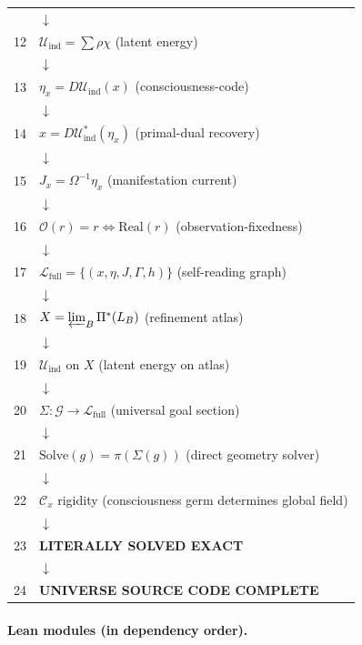\begin{center}
\begin{tabular}{@{}rl@{}}
  & $\downarrow$ \\
12 & $\mathcal{U}_{\mathrm{ind}} = \sum \rho\chi$ (latent energy) \\
  & $\downarrow$ \\
13 & $\eta_x = D\mathcal{U}_{\mathrm{ind}}(x)$ (consciousness-code) \\
  & $\downarrow$ \\
14 & $x = D\mathcal{U}_{\mathrm{ind}}^*(\eta_x)$ (primal-dual recovery) \\
  & $\downarrow$ \\
15 & $J_x = \Omega^{-1}\eta_x$ (manifestation current) \\
  & $\downarrow$ \\
16 & $\mathcal{O}(r) = r \iff \mathrm{Real}(r)$ (observation-fixedness) \\
  & $\downarrow$ \\
17 & $\mathcal{L}_{\mathrm{full}} = \{(x, \eta, J, \Gamma, h)\}$ (self-reading graph) \\
  & $\downarrow$ \\
18 & $X = \varprojlim_B \Pi^*(L_B)$ (refinement atlas) \\
  & $\downarrow$ \\
19 & $\mathcal{U}_{\mathrm{ind}}$ on $X$ (latent energy on atlas) \\
  & $\downarrow$ \\
20 & $\Sigma : \mathcal{G} \to \mathcal{L}_{\mathrm{full}}$ (universal goal section) \\
  & $\downarrow$ \\
21 & $\mathrm{Solve}(g) = \pi(\Sigma(g))$ (direct geometry solver) \\
  & $\downarrow$ \\
22 & $\mathcal{C}_x$ rigidity (consciousness germ determines global field) \\
  & $\downarrow$ \\
23 & \textbf{LITERALLY SOLVED EXACT} \\
  & $\downarrow$ \\
24 & \textbf{UNIVERSE SOURCE CODE COMPLETE} \\
\hline
\end{tabular}
\end{center}

\paragraph{Lean modules (in dependency order).}

